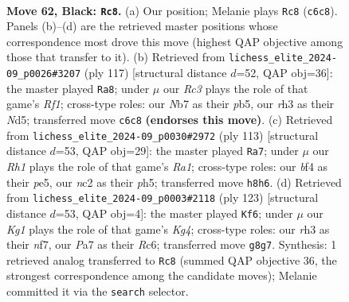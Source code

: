 \documentclass[11pt]{article}
\begin{document}
\clearpage

\begin{figure}[p]\centering
\begin{subfigure}{0.46\textwidth}\centering
\resizebox{\linewidth}{!}{%
\newchessgame
\chessboard[
  setfen={6kr/pn6/1pr1p3/7p/2PKPB2/6PR/P1N2R2/8 b - - 7 62},
  showmover=false,
  pgfstyle=straightmove, color=movearrow, markmove={c6-c8}
]}
\caption{}
\end{subfigure}\hfill
\begin{subfigure}{0.46\textwidth}\centering
\resizebox{\linewidth}{!}{%
\newchessgame
\chessboard[
  setfen={5r2/6pk/6p1/1P1n2r1/4p3/1R2P3/2R1BP1P/5K2 b - - 16 59},
  showmover=false,
  pgfstyle=straightmove, color=movearrow, markmove={f8-a8}
]}
\caption{}
\end{subfigure}
\\[4pt]
\begin{subfigure}{0.46\textwidth}\centering
\resizebox{\linewidth}{!}{%
\newchessgame
\chessboard[
  setfen={r2k4/5p2/2r1pN1p/4P2P/pnP2P2/R4B2/3K4/8 b - - 5 57},
  showmover=false,
  pgfstyle=straightmove, color=movearrow, markmove={a8-a7}
]}
\caption{}
\end{subfigure}\hfill
\begin{subfigure}{0.46\textwidth}\centering
\resizebox{\linewidth}{!}{%
\newchessgame
\chessboard[
  setfen={8/5N2/1pr1p3/p1p3kP/P1B5/1P2RK2/5P2/6r1 b - - 4 62},
  showmover=false,
  pgfstyle=straightmove, color=movearrow, markmove={g5-f6}
]}
\caption{}
\end{subfigure}
\caption{\textbf{Move 62, Black: \texttt{Rc8}.} (a) Our position; Melanie plays \texttt{Rc8} (\texttt{c6c8}). Panels (b)--(d) are the retrieved master positions whose correspondence most drove this move (highest QAP objective among those that transfer to it). (b) Retrieved from \texttt{lichess\_elite\_2024-09\_p0026\#3207} (ply 117) [structural distance $d$=52, QAP obj=36]: the master played \texttt{Ra8}; under $\mu$ our \emph{Rc3} plays the role of that game's \emph{Rf1}; cross-type roles: our \emph{N}b7 as their \emph{p}b5, our \emph{r}h3 as their \emph{N}d5; transferred move \texttt{c6c8} \textbf{(endorses this move)}. (c) Retrieved from \texttt{lichess\_elite\_2024-09\_p0030\#2972} (ply 113) [structural distance $d$=53, QAP obj=29]: the master played \texttt{Ra7}; under $\mu$ our \emph{Rh1} plays the role of that game's \emph{Ra1}; cross-type roles: our \emph{b}f4 as their \emph{p}e5, our \emph{n}c2 as their \emph{p}h5; transferred move \texttt{h8h6}. (d) Retrieved from \texttt{lichess\_elite\_2024-09\_p0003\#2118} (ply 123) [structural distance $d$=53, QAP obj=4]: the master played \texttt{Kf6}; under $\mu$ our \emph{Kg1} plays the role of that game's \emph{Kg4}; cross-type roles: our \emph{r}h3 as their \emph{n}f7, our \emph{P}a7 as their \emph{R}c6; transferred move \texttt{g8g7}. Synthesis: 1 retrieved analog transferred to \texttt{Rc8} (summed QAP objective 36, the strongest correspondence among the candidate moves); Melanie committed it via the \texttt{search} selector.}
\label{fig:thought-m123}
\end{figure}
\end{document}

